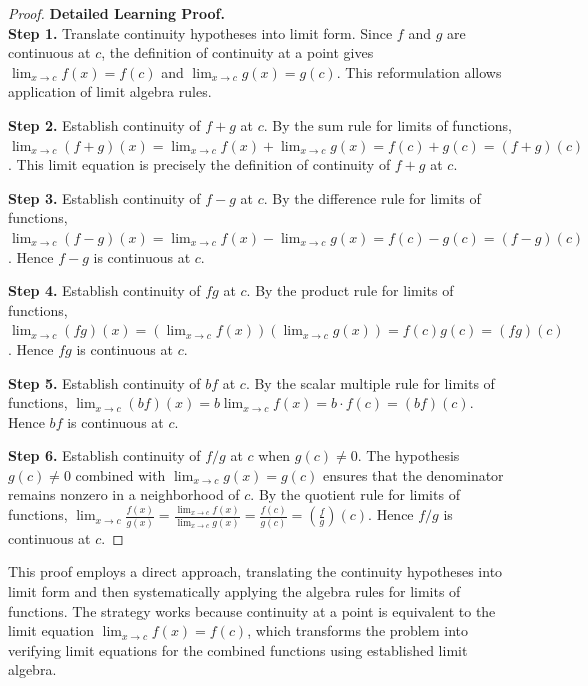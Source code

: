 \begin{proof}
\textbf{Detailed Learning Proof.}~\\

\textbf{Step 1.} Translate continuity hypotheses into limit form. Since $f$ and $g$ are continuous at $c$, the definition of continuity at a point gives $\lim_{x\to c} f(x)=f(c)$ and $\lim_{x\to c} g(x)=g(c)$. This reformulation allows application of limit algebra rules.

\textbf{Step 2.} Establish continuity of $f+g$ at $c$. By the sum rule for limits of functions, $\lim_{x\to c} (f+g)(x) = \lim_{x\to c} f(x) + \lim_{x\to c} g(x) = f(c) + g(c) = (f+g)(c)$. This limit equation is precisely the definition of continuity of $f+g$ at $c$.

\textbf{Step 3.} Establish continuity of $f-g$ at $c$. By the difference rule for limits of functions, $\lim_{x\to c} (f-g)(x) = \lim_{x\to c} f(x) - \lim_{x\to c} g(x) = f(c) - g(c) = (f-g)(c)$. Hence $f-g$ is continuous at $c$.

\textbf{Step 4.} Establish continuity of $fg$ at $c$. By the product rule for limits of functions, $\lim_{x\to c} (fg)(x) = \left(\lim_{x\to c} f(x)\right) \left(\lim_{x\to c} g(x)\right) = f(c)g(c) = (fg)(c)$. Hence $fg$ is continuous at $c$.

\textbf{Step 5.} Establish continuity of $bf$ at $c$. By the scalar multiple rule for limits of functions, $\lim_{x\to c} (bf)(x) = b \lim_{x\to c} f(x) = b \cdot f(c) = (bf)(c)$. Hence $bf$ is continuous at $c$.

\textbf{Step 6.} Establish continuity of $f/g$ at $c$ when $g(c) \neq 0$. The hypothesis $g(c) \neq 0$ combined with $\lim_{x\to c} g(x) = g(c)$ ensures that the denominator remains nonzero in a neighborhood of $c$. By the quotient rule for limits of functions, $\lim_{x\to c} \frac{f(x)}{g(x)} = \frac{\lim_{x\to c} f(x)}{\lim_{x\to c} g(x)} = \frac{f(c)}{g(c)} = \left(\frac{f}{g}\right)(c)$. Hence $f/g$ is continuous at $c$.
\end{proof}

\begin{remark*}
This proof employs a direct approach, translating the continuity hypotheses into limit form and then systematically applying the algebra rules for limits of functions. The strategy works because continuity at a point is equivalent to the limit equation $\lim_{x \to c} f(x) = f(c)$, which transforms the problem into verifying limit equations for the combined functions using established limit algebra.
\end{remark*}

